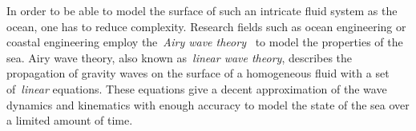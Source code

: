 


% 

% 
% 
In order to be able to model the surface of such an intricate fluid system as the ocean, one has to reduce complexity.
Research fields such as ocean engineering or coastal engineering employ the~\emph{Airy wave theory}~\citep{book:airy1845tides}
to model the properties of the sea. Airy wave theory, also known as~\emph{linear wave theory}, describes the propagation of
gravity waves on the surface of a homogeneous fluid with a set of~\emph{linear} equations. These equations give
a decent approximation of the wave dynamics and kinematics with enough accuracy to model the state of the sea over a
limited amount of time.

